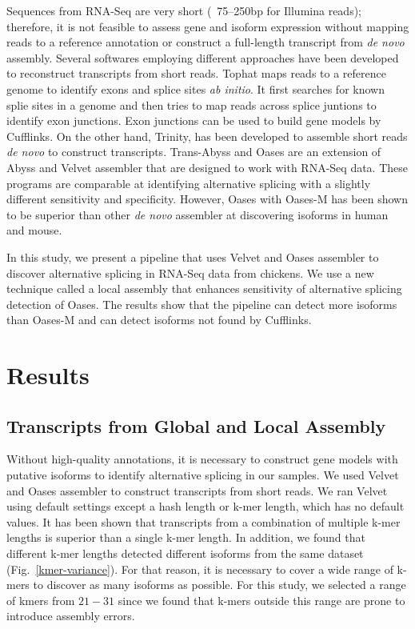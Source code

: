 \documentclass[10pt]{article}
\begin{document}
Sequences from RNA-Seq are very short (~75--250bp for Illumina reads); therefore, it is not feasible to assess gene
and isoform expression without mapping reads to a reference annotation or construct a full-length transcript from
\emph{de novo} assembly.
Several softwares employing different approaches have been developed to reconstruct transcripts from short reads.
Tophat\cite{Trapnell:2009dp} maps reads to a reference genome to identify exons and splice sites \emph{ab initio}.
It first searches for known splie sites in a genome and then tries to map reads across splice juntions to identify exon junctions.
Exon junctions can be used to build gene models by Cufflinks\cite{Trapnell:2010kd}.
On the other hand, Trinity\cite{Grabherr:2011jb}, has been developed to assemble short reads \emph{de novo} to construct transcripts.
Trans-Abyss\cite{Robertson:2010ih} and Oases\cite{Schulz:2012je} are an extension of Abyss\cite{Simpson:2009iv} and Velvet\cite{Zerbino:2008vu,Zerbino:2009jp} assembler that are designed to work with RNA-Seq data.
These programs are comparable at identifying alternative splicing with a slightly different sensitivity and specificity.
However, Oases with Oases-M has been shown to be superior than other \emph{de novo} assembler at discovering isoforms in human and mouse\cite{Schulz:2012je}.

In this study, we present a pipeline that uses Velvet and Oases assembler to discover alternative splicing in RNA-Seq data from chickens.
We use a new technique called a local assembly that enhances sensitivity of alternative splicing detection of Oases.
The results show that the pipeline can detect more isoforms than Oases-M and can detect isoforms not found by
Cufflinks.

\section*{Results}


\subsection*{Transcripts from Global and Local Assembly}

Without high-quality annotations, it is necessary to construct gene models with putative isoforms to identify alternative splicing in our samples.
We used Velvet\cite{Zerbino:2008vu} and Oases\cite{Schulz:2012je} assembler to construct transcripts from short reads.
We ran Velvet using default settings except a hash length or k-mer length, which has no default values.
It has been shown that transcripts from a combination of multiple k-mer lengths is superior than a single k-mer
length\cite{Schulz:2012je}.
In addition, we found that different k-mer lengths detected different isoforms from the same dataset
(Fig.~\ref{kmer-variance}).
For that reason, it is necessary to cover a wide range of k-mers to discover as many isoforms as possible.
For this study, we selected a range of kmers from $21-31$ since we found that k-mers outside this range are prone
to introduce assembly errors.
\end{document}
